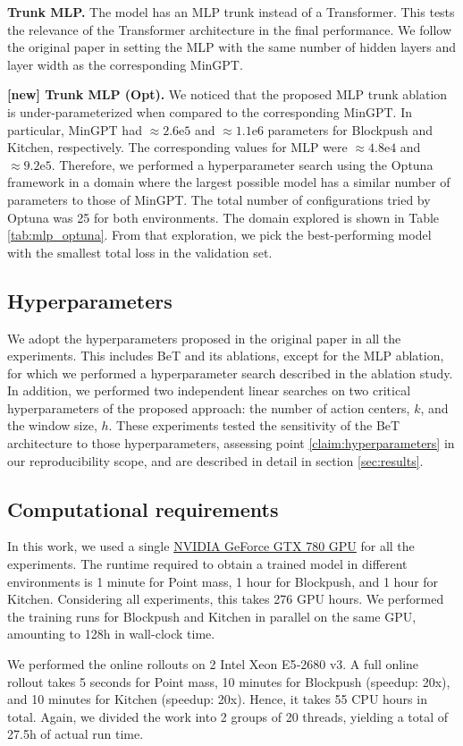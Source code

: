 \textbf{Trunk MLP.} The model has an MLP trunk instead of a Transformer.
This tests the relevance of the Transformer architecture in the final performance.
We follow the original paper in setting the MLP with the same number of hidden layers and layer width as the corresponding MinGPT.

\textbf{[new] Trunk MLP (Opt).} We noticed that the proposed MLP trunk ablation is under-parameterized when compared to the corresponding MinGPT.
In particular, MinGPT had $\approx 2.6\mathrm{e}{5}$ and $\approx 1.1\mathrm{e}{6}$ parameters for Blockpush and Kitchen, respectively.
The corresponding values for MLP were $\approx 4.8\mathrm{e}{4}$ and $\approx9.2\mathrm{e}{5}$.
Therefore, we performed a hyperparameter search using the Optuna~\cite{akiba_optuna_2019} framework in a domain where the largest possible model has a similar number of parameters to those of MinGPT.
The total number of configurations tried by Optuna was 25 for both environments. The domain explored is shown in Table \ref{tab:mlp_optuna}. From that exploration, we pick the best-performing model with the smallest total loss in the validation set.

\subsection{Hyperparameters}
We adopt the hyperparameters proposed in the original paper in all the experiments.
This includes BeT and its ablations, except for the MLP ablation, for which we performed a hyperparameter search described in the ablation study.
In addition, we performed two independent linear searches on two critical hyperparameters of the proposed approach: the number of action centers, $k$, and the window size, $h$.
These experiments tested the sensitivity of the BeT architecture to those hyperparameters, assessing point \ref{claim:hyperparameters} in our reproducibility scope, and are described in detail in section \ref{sec:results}.

\subsection{Computational requirements}
In this work, we used a single \href{https://www.dropbox.com/s/0k1zi6h9x6iqgxq/redhawk.jpg?dl=0}{NVIDIA GeForce GTX 780 GPU} for all the experiments.
The runtime required to obtain a trained model in different environments is 1 minute for Point mass, 1 hour for Blockpush, and 1 hour for Kitchen.
Considering all experiments, this takes 276 GPU hours.
We performed the training runs for Blockpush and Kitchen in parallel on the same GPU, amounting to 128h in wall-clock time.

We performed the online rollouts on 2 Intel Xeon E5‐2680 v3.
A full online rollout takes 5 seconds for Point mass, 10 minutes for Blockpush (speedup: 20x), and 10 minutes for Kitchen (speedup: 20x).
Hence, it takes 55 CPU hours in total.
Again, we divided the work into 2 groups of 20 threads, yielding a total of 27.5h of actual run time.
